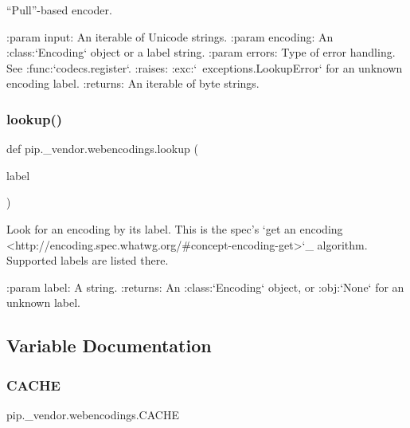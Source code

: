 \begin{DoxyVerb}“Pull”-based encoder.

:param input: An iterable of Unicode strings.
:param encoding: An :class:`Encoding` object or a label string.
:param errors: Type of error handling. See :func:`codecs.register`.
:raises: :exc:`~exceptions.LookupError` for an unknown encoding label.
:returns: An iterable of byte strings.\end{DoxyVerb}
 \mbox{\label{namespacepip_1_1__vendor_1_1webencodings_ae558e10f94082a6e5104e4a19de375eb}} 
\subsubsection{\texorpdfstring{lookup()}{lookup()}}
{\footnotesize\ttfamily def pip.\+\_\+vendor.\+webencodings.\+lookup (\begin{DoxyParamCaption}\item[{}]{label }\end{DoxyParamCaption})}

\begin{DoxyVerb}Look for an encoding by its label.
This is the spec’s `get an encoding
<http://encoding.spec.whatwg.org/#concept-encoding-get>`_ algorithm.
Supported labels are listed there.

:param label: A string.
:returns:
    An :class:`Encoding` object, or :obj:`None` for an unknown label.\end{DoxyVerb}
 

\subsection{Variable Documentation}
\mbox{\label{namespacepip_1_1__vendor_1_1webencodings_a99b3ec77071e1286ccce1c9d509cfa39}} 
\subsubsection{\texorpdfstring{C\+A\+C\+HE}{CACHE}}
{\footnotesize\ttfamily pip.\+\_\+vendor.\+webencodings.\+C\+A\+C\+HE}

